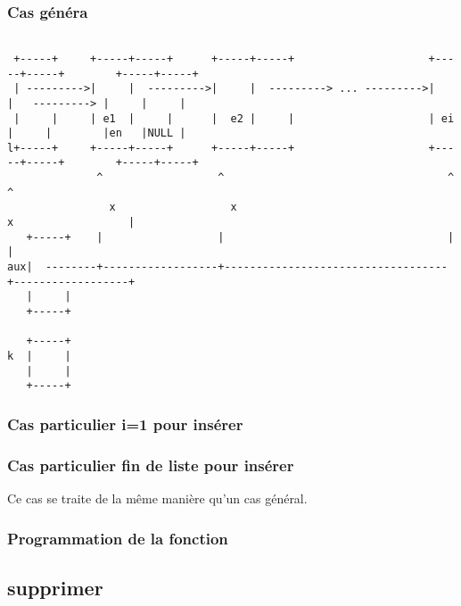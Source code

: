 \documentclass{article}
\begin{document}
	\subsubsection{Cas généra}
		\begin{verbatim}
   
 +-----+     +-----+-----+      +-----+-----+                     +-----+-----+        +-----+-----+       
 | --------->|     |  --------->|     |  ---------> ... --------->|     |   ---------> |     |     |
 |     |     | e1  |     |      |  e2 |     |                     | ei  |     |        |en   |NULL |
l+-----+     +-----+-----+      +-----+-----+                     +-----+-----+        +-----+-----+              
              ^                  ^                                   ^                  ^
         	    x                  x                                   x                  |
   +-----+    |                  |                                   |                  | 
aux|  --------+------------------+-----------------------------------+------------------+
   |     |
   +-----+

   +-----+
k  |     |
   |     |
   +-----+
		\end{verbatim}
		
	\subsubsection{Cas particulier i=1 pour insérer}
	
		
	\subsubsection{Cas particulier fin de liste pour insérer}
	Ce cas se traite de la même manière qu'un cas général.
	\subsubsection{Programmation de la fonction}
		
	\subsection{supprimer}
		

			
\end{document}
